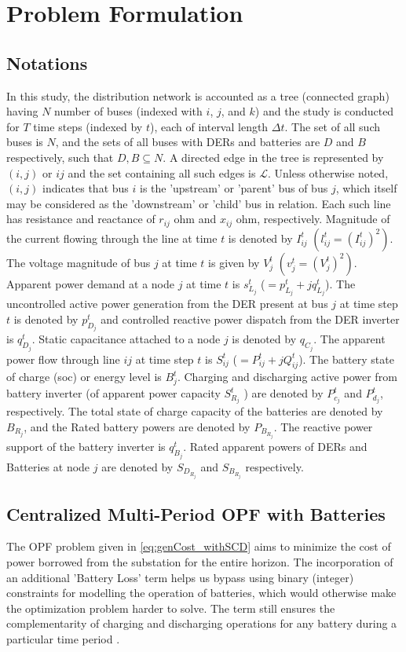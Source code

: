 \documentclass[../../outputs/main.tex]{subfiles}
\begin{document}
\section{Problem Formulation}

\subsection{Notations}
In this study, the distribution network is accounted as a tree (connected graph) having $N$ number of buses (indexed with \(i\), \(j\), and \(k\)) and the study is conducted for $T$ time steps (indexed by $t$), each of interval length $\Delta t$. The set of all such buses is $N$, and the sets of all buses with DERs and batteries are $D$ and $B$ respectively, such that $D, B \subseteq N$.
A directed edge in the tree is represented by $(i, j)$ or $ij$ and the set containing all such edges is $\mathcal{L}$. Unless otherwise noted, $(i, j)$ indicates that bus $i$ is the 'upstream' or 'parent' bus of bus $j$, which itself may be considered as the 'downstream' or 'child' bus in relation. Each such line has resistance and reactance of \(r_{ij}\) ohm and \(x_{ij}\) ohm, respectively. Magnitude of the current flowing through the line at time \(t\) is denoted by \(I_{ij}^t\) $\left(l_{ij}^t=\left(I_{ij}^t\right)^2\right)$. The voltage magnitude of bus \(j\) at time \(t\) is given by \(V_j^t\) $\left(v_j^t=\left(V_j^t\right)^2\right)$. Apparent power demand at a node \(j\) at time \(t\) is \(s^t_{L_j}\) (\(=p^t_{L_j}+\textit{j}q^t_{L_j}\)). The uncontrolled active power generation from the DER present at bus \(j\) at time step \(t\) is denoted by \(p^t_{D_j}\) and controlled reactive power dispatch from the DER inverter is \(q^t_{D_j}\). Static capacitance attached to a node $j$ is denoted by $q_{C_j}$. The apparent power flow through line {\(ij\)} at time step \(t\) is \(S_{ij}^t\) (\(=P_{ij}^t+\textit{j}Q_{ij}^t\)). The battery state of charge (soc) or energy level is \(B_j^t\). Charging and discharging active power from battery inverter (of apparent power capacity \(S^{t}_{R_j}\) ) are denoted by \(P_{c_j}^t\) and \(P_{d_j}^t\), respectively. The total state of charge capacity of the batteries are denoted by $B_{R_j}$, and the Rated battery powers are denoted by $P_{B_{R_j}}$. The reactive power support of the battery inverter is \(q_{B_j}^t\). Rated apparent powers of DERs and Batteries at node $j$ are denoted by $S_{D_{R_j}}$ and $S_{B_{R_j}}$ respectively.

\subsection{Centralized Multi-Period OPF with Batteries}
The OPF problem given in \cref{eq:genCost_withSCD} aims to minimize the cost of power borrowed from the substation for the entire horizon. The incorporation of an additional 'Battery Loss' term helps us bypass using binary (integer) constraints for modelling the operation of batteries, which would otherwise make the optimization problem harder to solve. The term still ensures the complementarity of charging and discharging operations for any battery during a particular time period \cite{Nazir2018Jun, Nazir2019Jun, Nazir2021Sep}.
\end{document}
